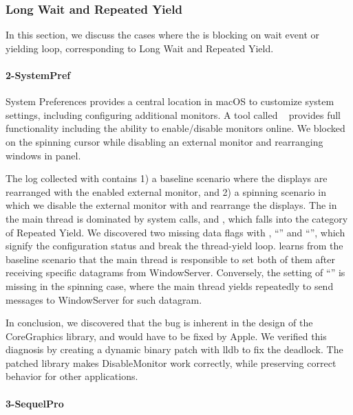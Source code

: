 \subsubsection{Long Wait and Repeated Yield}

In this section, we discuss the cases where the \spinningnode is blocking on
wait event or yielding loop, corresponding to Long Wait and Repeated Yield.

\paragraph{2-SystemPref}

System Preferences provides a central location in macOS to customize system
settings, including configuring additional monitors. A tool called
~\cite{disablemonitor} provides full functionality including
the ability to enable/disable monitors online. We blocked on the spinning
cursor while disabling an external monitor and rearranging windows in
 panel.

The log collected with \xxx contains 1) a baseline scenario where the displays
are rearranged with the enabled external monitor, and 2) a spinning scenario in
which we disable the external monitor with  and rearrange
the displays. The \spinningnode in the main thread is dominated by system
calls,  and , which falls into the category of
Repeated Yield. We discovered two missing data flags with ,
``'' and ``'', which
signify the configuration status and break the thread-yield loop. \xxx learns
from the baseline scenario that the main thread is responsible to set both of
them after receiving specific datagrams from WindowServer. Conversely, the
setting of ``'' is missing in the spinning case,
where the main thread yields repeatedly to send messages to WindowServer for
such datagram.

In conclusion, we discovered that the bug is inherent in the design of the
CoreGraphics library, and would have to be fixed by Apple. We verified this
diagnosis by creating a dynamic binary patch with lldb to fix the deadlock. The
patched library makes DisableMonitor work correctly, while preserving correct
behavior for other applications.

\paragraph{3-SequelPro}

